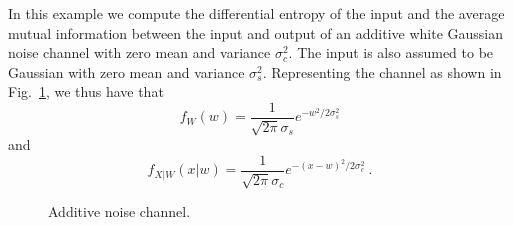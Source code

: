 \begin{example}
\label{ch01.ex11.2.4}
In this example we compute the differential entropy of the input and the
average mutual information between the input and output of an additive
white Gaussian noise channel with zero mean and variance $ \sigma^2_c $.
The input is
also assumed to be Gaussian with zero mean and variance $ \sigma^2_s $.
Representing the channel as shown in Fig.~\ref{ch01.fig11.2.2},
we thus have that
\begin{equation}
 f_W(w) = \frac{1}{ \sqrt{2\pi} \sigma_s } e^{-w^2/2\sigma^2_s}
\label{ch01.eq11.2.31}
\end{equation}
and
\begin{equation}
 f_{X|W} (x|w) = \frac{1}{ \sqrt{2\pi} \sigma_c }
 e^{-(x-w)^2 / 2\sigma^2_c} ~.
\label{ch01.eq11.2.32}
\end{equation}

\begin{figure}[hbt] %
 \figboxes
\caption{Additive noise channel.
\label{ch01.fig11.2.2} }
\end{figure}


\end{example}
